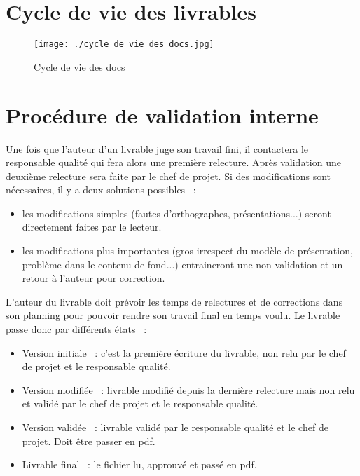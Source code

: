 \section{Cycle de vie des livrables}

\begin{figure}[h]
    \centering
    \texttt{[image: ./cycle de vie des docs.jpg]}
    \caption{Cycle de vie des docs}
    \label{diagram:si_map}
\end{figure}

\section{Procédure de validation interne}
  Une fois que l'auteur d'un livrable juge son travail fini, il contactera le responsable qualité qui fera alors une première relecture. Après validation une deuxième relecture sera faite par le chef de projet.
Si des modifications sont nécessaires, il y a deux solutions possibles  :
\begin{itemize}
    \item les modifications simples (fautes d'orthographes, présentations...) seront directement faites par le lecteur.
    \item les modifications plus importantes (gros irrespect du modèle de présentation, problème dans le contenu de fond...) entraineront une non validation et un retour à l'auteur pour correction.
\end{itemize}
	L'auteur du livrable doit prévoir les temps de relectures et de corrections dans son planning pour pouvoir rendre son travail final en temps voulu.
	Le livrable passe donc par différents états  :
\begin{itemize}
    \item Version initiale  : c'est la première écriture du livrable, non relu par le chef de projet et le responsable qualité.
    \item Version modifiée  : livrable modifié depuis la dernière relecture mais non relu et validé par le chef de projet et le responsable qualité.
    \item Version validée  : livrable validé par le responsable qualité et le chef de projet. Doit être passer en pdf.
    \item Livrable final  : le fichier lu, approuvé et passé en pdf.
\end{itemize}

